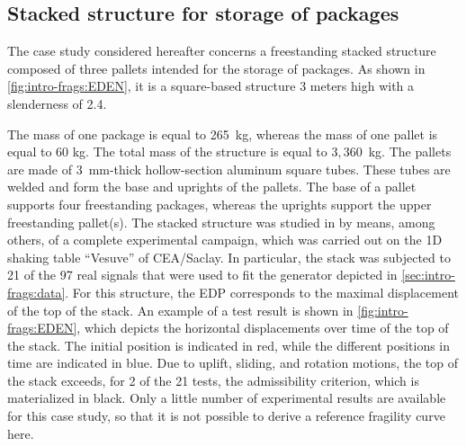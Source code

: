   
   
    


    \subsection{Stacked structure for storage of packages}\label{sec:intro-frags:stacked}



    The case study considered hereafter concerns a freestanding stacked structure composed of three pallets intended for the storage of packages. As shown in \cref{fig:intro-frags:EDEN}, it is a square-based structure 3 meters high with a slenderness of 2.4.
    
    
    
    The mass of one package is equal to 265~kg, whereas the mass of one pallet is equal to 60 kg. The total mass of the structure is equal to $3,360$~kg. The pallets are made of 3~mm-thick hollow-section aluminum square tubes. These tubes are welded and form the base and uprights of the pallets. The base of a pallet supports four freestanding packages, whereas the uprights support the upper freestanding pallet(s). The stacked structure was studied in \cite{beylat_contribution_2020} by means, among others, of a complete experimental campaign, which was carried out on the 1D shaking table ``Vesuve'' of CEA/Saclay. In particular, the stack was subjected to 21 of the 97 real signals that were used to fit the generator depicted in \cref{sec:intro-frags:data}.
    For this structure, the EDP corresponds to the maximal displacement of the top of the stack.
    An example of a test result is shown in \cref{fig:intro-frags:EDEN}, which depicts the horizontal displacements over time of the top of the stack. The initial position is indicated in red, while the different positions in time are indicated in blue. {Due to uplift, sliding, and rotation motions, the top of the stack exceeds, for 2 of the 21 tests, the admissibility criterion, which is materialized in black. }
    Only a little number of experimental results are available for this case study, so that it is not possible to derive a reference fragility curve here.





